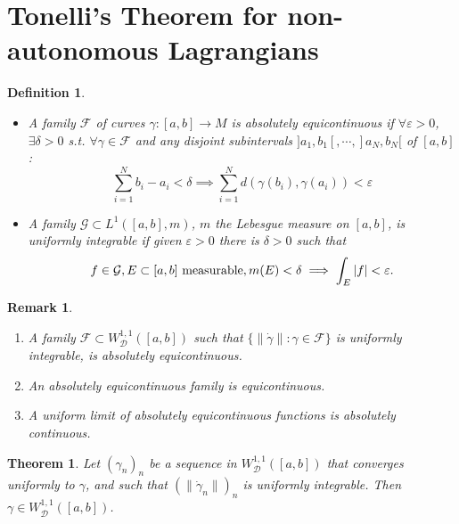 \documentclass[10pt,a4paper]{amsart}
\newtheorem{theorem}{Theorem}
\newtheorem{definition}{Definition}
\newtheorem{remark}{Remark}
\newcommand{\cD}{\mathcal D}
\newcommand{\cW}{W^{1,1}}
\newcommand{\cWD}{\cW_\cD}
\newcommand{\cF}{\mathcal F}
\newcommand{\cG}{\mathcal G}
\newcommand{\ep}{\varepsilon}
\newcommand{\ga}{\gamma}
\newcommand{\de}{\delta}
\newcommand{\dga}{\dot\gamma}
\begin{document}
 \section{Tonelli's Theorem for non-autonomous Lagrangians}
\label{sec:tonelli}
\begin{definition}\quad
  \begin{itemize} 
   \item  A family $\cF$  of curves $\ga:[a,b]\to M$ is absolutely
  equicontinuous if $\forall\ep>0$, $\exists\de>0$
  s.t. $\forall\ga\in\cF$ and any  disjoint subintervals $ ]a_1,b_1[,\cdots,]a_N,b_N[$ 
 of $[a,b]$:
  \[\sum_{i=1}^Nb_i-a_i<\de\implies \sum_{i=1}^Nd(\ga(b_i),\ga(a_i))<\ep\]
\item A
 family $\cG\subset L^1([a,b],m)$,  $m$ the Lebesgue measure on
 $[a,b]$, is uniformly integrable 
if given $\ep>0$ there is $\de>0$ such that 
\[f\in\cG, E\subset[a,b]\hbox{ measurable}, m(E)<\de\implies
  \int_E|f|<\ep.\]
   \end{itemize}
 
\end{definition}
\begin{remark}\label{basic}\quad
  \begin{enumerate}
  \item  A family $\cF\subset\cWD([a,b])$ such that $\{\|\dga\| : \ga\in\cF\}$
    is uniformly integrable, is absolutely equicontinuous.
  \item An absolutely equicontinuous family is equicontinuous.
  \item A uniform limit of absolutely equicontinuous  functions
    is absolutely continuous.
    \end{enumerate}
\end{remark}
\begin{theorem}{\cite{SM}}\label{hor}
  Let $(\ga_n)_n$ be a sequence in $\cWD([a,b])$ that converges uniformly to
  $\ga$, and such that
  $( \|\dga _n\|)_n$ is uniformly integrable.   Then $\ga\in\cWD([a,b])$.
  \end{theorem}
\end{document}
